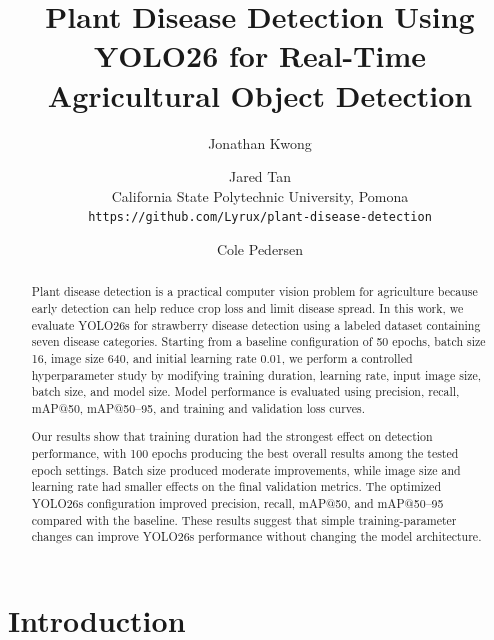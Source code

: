 \documentclass[10pt,twocolumn,letterpaper]{article}
\begin{document}
\title{Plant Disease Detection Using YOLO26 for Real-Time Agricultural Object Detection}
\author{Jonathan Kwong\\
\and
Jared Tan\\
California State Polytechnic University, Pomona\\
{\tt\small https://github.com/Lyrux/plant-disease-detection}
\and
Cole Pedersen\\
}

\maketitle

\begin{abstract}
Plant disease detection is a practical computer vision problem for agriculture because early detection can help reduce crop loss and limit disease spread. In this work, we evaluate YOLO26s for strawberry disease detection using a labeled dataset containing seven disease categories. Starting from a baseline configuration of 50 epochs, batch size 16, image size 640, and initial learning rate 0.01, we perform a controlled hyperparameter study by modifying training duration, learning rate, input image size, batch size, and model size. Model performance is evaluated using precision, recall, mAP@50, mAP@50--95, and training and validation loss curves.

Our results show that training duration had the strongest effect on detection performance, with 100 epochs producing the best overall results among the tested epoch settings. Batch size produced moderate improvements, while image size and learning rate had smaller effects on the final validation metrics. The optimized YOLO26s configuration improved precision, recall, mAP@50, and mAP@50--95 compared with the baseline. These results suggest that simple training-parameter changes can improve YOLO26s performance without changing the model architecture.
\end{abstract}

\section{Introduction}
\label{sec:intro}
\end{document}
